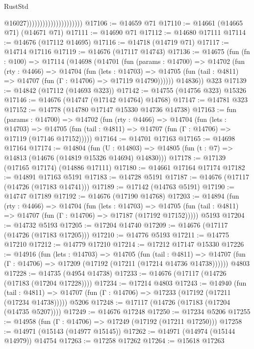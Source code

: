 \begin{lexlean}{RustStd}
\begin{coremodule}
                                              @16027)))))))))))))))))))))
@17106 := @14659 @71
@17110 := @14661 (@14665 @71) (@14671 @71)
@17111 := @14690 @71
@17112 := @14680 @17111
@17114 := @14676 (@17112 @14695)
@17116 := @14718 (@14719 @71)
@17117 := @14714 @17116
@17119 := @14676 (@17117 @14743)
@17136 := @14675
    (fun (fn : @100) =>
    @17114
      (@14698
        (@14701
          (fun (params : @14700) =>
          @14702
            (fun (rty : @4466) =>
            @14704
              (fun (lets : @14703) =>
              @14705 (fun (tail : @4811) => @14707 (fun (Γ : @14706) => @17119 @14790))))))
        @14836))
    @323
@17139 := @14842 (@17112 (@14693 @323))
@17142 := @14755 (@14756 @323) @15326
@17146 := @14676 (@14747 (@17142 @14764) @14768)
@17147 := @14781 @323
@17152 := @14778 (@14780 @17147 @15330 @14736 @14738)
@17163 := fun (params : @14700) =>
  @14702
    (fun (rty : @4466) =>
    @14704
      (fun (lets : @14703) =>
      @14705 (fun (tail : @4811) => @14707 (fun (Γ : @14706) => @17119 (@17146 @17152)))))
@17164 := @14701 @17163
@17165 := @14698 @17164
@17174 := @14804
    (fun (U : @14803) => @14805 (fun (t : @7) => @14813 (@14676 (@14819 @15326 @14694) @14830)))
@17178 := @17139 (@17165 @17174) (@14886 @17111)
@17180 := @14661 @17164 @17174
@17182 := @14891 @17163 @5191
@17183 := @14728 @5191
@17187 := @14676 (@17117 (@14726 (@17183 @14741)))
@17189 := @17142 (@14763 @5191)
@17190 := @14747 @17189
@17192 := @14676 (@17190 @14768)
@17203 := @14894
    (fun (rty : @4466) =>
    @14704
      (fun (lets : @14703) =>
      @14705 (fun (tail : @4811) => @14707 (fun (Γ : @14706) => @17187 (@17192 @17152)))))
    @5193
@17204 := @14732 @5193
@17205 := @17204 @14740
@17209 := @14676 (@17117 (@14726 (@17183 @17205)))
@17210 := @14776 @5193
@17211 := @14775 @17210
@17212 := @14779 @17210
@17214 := @17212 @17147 @15330
@17226 := @14916
    (fun (lets : @14703) =>
    @14705
      (fun (tail : @4811) =>
      @14707 (fun (Γ : @14706) => @17209 (@17192 (@17211 (@17214 @14736 @14738))))))
    @4803
@17228 := @14735 (@4954 @14738)
@17233 := @14676 (@17117 (@14726 (@17183 (@17204 @17228))))
@17234 := @17214 @4803
@17243 := @14940
    (fun (tail : @4811) => @14707 (fun (Γ : @14706) => @17233 (@17192 (@17211 (@17234 @14738)))))
    @5206
@17248 := @17117 (@14726 (@17183 (@17204 (@14735 @5207))))
@17249 := @14676 @17248
@17250 := @17234 @5206
@17255 := @14958 (fun (Γ : @14706) => @17249 (@17192 (@17211 @17250)))
@17258 := @14971 (@15143 (@14977 @15145))
@17262 := @14971 (@14974 (@15144 @14979)) @14754
@17263 := @17258 @17262
@17264 := @15618 @17263

\end{coremodule}
\end{lexlean}

